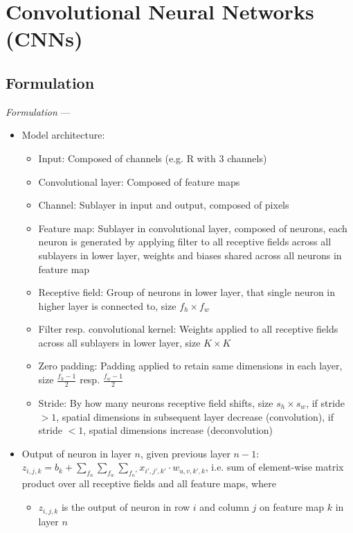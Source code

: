 \section{Convolutional Neural Networks (CNNs)}
\subsection*{Formulation}
\emph{Formulation} --- 
\begin{itemize}
    \item Model architecture: 
    \begin{itemize}
        \item Input: Composed of channels (e.g. R with 3 channels)
        \item Convolutional layer: Composed of feature maps
        \item Channel: Sublayer in input and output, composed of pixels
        \item Feature map: Sublayer in convolutional layer, composed of neurons, each neuron is generated by applying filter to all receptive fields across all sublayers in lower layer, weights and biases shared across all neurons in feature map
        \item Receptive field: Group of neurons in lower layer, that single neuron in higher layer is connected to, size $f_h \times f_w$
        \item Filter resp. convolutional kernel: Weights applied to all receptive fields across all sublayers in lower layer, size $K \times K$
        \item Zero padding: Padding applied to retain same dimensions in each layer, size $\frac{f_h - 1}{2}$ resp. $\frac{f_w - 1}{2}$
        \item Stride: By how many neurons receptive field shifts, size $s_h \times s_w$, if stride $> 1$, spatial dimensions in subsequent layer decrease (convolution), if stride $< 1$, spatial dimensions increase (deconvolution)
    \end{itemize}
    \item Output of neuron in layer $n$, given previous layer $n-1$: \\
    $z_{i,j,k} = b_k + \sum_{f_n} \sum_{f_w} \sum_{f_n'} x_{i',j',k'} \cdot w_{u,v,k',k}$, i.e. sum of element-wise matrix product over all receptive fields and all feature maps, where
    \begin{itemize}
        \item $z_{i,j,k}$ is the output of neuron in row $i$ and column $j$ on feature map $k$ in layer $n$

\end{itemize}
\end{itemize}
